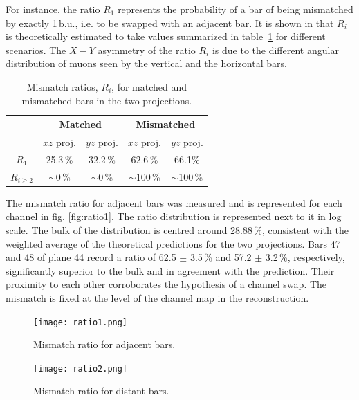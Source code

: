 \documentclass[a4paper,11pt]{article}
\begin{document}
For instance, the ratio $R_1$ represents the probability of a bar of being mismatched by exactly 1\,$\mathrm{b.u.}$, i.e. to be swapped with an adjacent bar.
It is shown in \cite{Francois} that $R_i$ is theoretically estimated to take values summarized in table~\ref{tab:mismatch_ratio} for different scenarios.
The $X-Y$ asymmetry of the ratio $R_i$ is due to the different angular distribution of muons seen by the vertical and the horizontal bars.

\begin{table}[!h]
 \centering
 \begin{tabular}{c|c|c|c|c}
  & \multicolumn{2}{c|}{Matched} & \multicolumn{2}{c}{Mismatched}  \\
  \hline
  & $xz$ proj. & $yz$ proj. & $xz$ proj. & $yz$ proj. \\
  \hline
  $R_1$ & 25.3\,\% & 32.2\,\% & 62.6\,\% & 66.1\%  \\
  $R_{i\geq2}$ & $\sim$0\,\% & $\sim$0\,\% & $\sim$100\,\% & $\sim$100\,\%
 \end{tabular}
 \caption{Mismatch ratios, $R_i$, for matched and mismatched bars in the two projections.}
 \label{tab:mismatch_ratio}
\end{table}

The mismatch ratio for adjacent bars was measured and is represented for each channel in fig. \ref{fig:ratio1}. The ratio distribution is represented next
to it in log scale. The bulk of the distribution is centred around 28.88\,\%, consistent with the weighted average of the theoretical predictions for the two
projections. Bars 47  and 48 of plane 44 record a ratio of 62.5 $\pm$ 3.5\,\% and 57.2 $\pm$ 3.2\,\%, respectively, significantly superior to the bulk and in
agreement with the prediction. Their proximity to each other corroborates the hypothesis of a channel swap. The mismatch is fixed at the level of the channel
map in the reconstruction.

\begin{figure}[htr!]
  \begin{minipage}[b]{.49\textwidth}
   \centering
   \texttt{[image: ratio1.png]}
   \caption{Mismatch ratio for adjacent bars.}
   \label{fig:ratio1}
  \end{minipage}
  \begin{minipage}[b]{.49\textwidth}
   \centering
   \texttt{[image: ratio2.png]}
   \caption{Mismatch ratio for distant bars.}
   \label{fig:ratio2}
  \end{minipage}
\end{figure}
\end{document}

